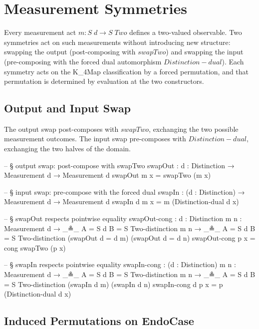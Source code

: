 \documentclass[11pt,a4paper]{book}
\def\texttt#1{#1}%
\def\text#1{#1}%
\begin{document}
\chapter{Measurement Symmetries}
\label{ch:measurement-symmetries}

Every measurement act $m : S\;d \to S\;\text{Two}$ defines a two-valued observable.
Two symmetries act on such measurements without introducing new structure:
swapping the output (post-composing with $\texttt{swapTwo}$) and swapping the
input (pre-composing with the forced dual automorphism $\texttt{Distinction-dual}$).
Each symmetry acts on the \texttt{K\_4Map} classification by a forced permutation,
and that permutation is determined by evaluation at the two constructors.

\section{Output and Input Swap}

The output swap post-composes with $\texttt{swapTwo}$, exchanging the two
possible measurement outcomes.  The input swap pre-composes with $\texttt{Distinction-dual}$,
exchanging the two halves of the domain.

\begin{code}
-- § output swap: post-compose with swapTwo
swapOut : {d : Distinction} → Measurement d → Measurement d
swapOut m x = swapTwo (m x)

-- § input swap: pre-compose with the forced dual
swapIn : (d : Distinction) → Measurement d → Measurement d
swapIn d m x = m (Distinction-dual d x)

-- § swapOut respects pointwise equality
swapOut-cong :
  {d : Distinction} {m n : Measurement d} →
  _≗_ {A = S d} {B = S Two-distinction} m n →
  _≗_ {A = S d} {B = S Two-distinction} (swapOut {d = d} m) (swapOut {d = d} n)
swapOut-cong p x = cong swapTwo (p x)

-- § swapIn respects pointwise equality
swapIn-cong :
  (d : Distinction) {m n : Measurement d} →
  _≗_ {A = S d} {B = S Two-distinction} m n →
  _≗_ {A = S d} {B = S Two-distinction} (swapIn d m) (swapIn d n)
swapIn-cong d p x = p (Distinction-dual d x)
\end{code}

\section{Induced Permutations on EndoCase}
\end{document}

